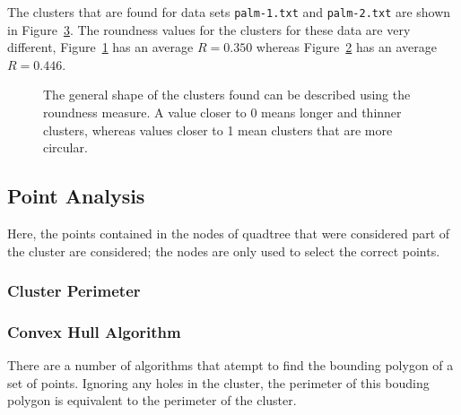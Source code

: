 The clusters that are found for data sets \texttt{palm-1.txt} and
\texttt{palm-2.txt} are shown in Figure~\ref{fig:roundness}. The roundness
values for the clusters for these data are very different,
Figure~\ref{fig:roundness-long.png} has an average $R=0.350$ whereas
Figure~\ref{fig:roundness-round.png} has an average $R=0.446$.

\begin{figure}[tbhp]
	\centering
	\begin{subfigure}[b]{4.2cm}
		\caption{}\label{fig:roundness-long.png}
	\end{subfigure}%
	\quad
	\begin{subfigure}[b]{4.2cm}
		\caption{}\label{fig:roundness-round.png}
	\end{subfigure}

	\caption[A comparison of roundness values.]{The general shape of the
		clusters found can be described using the roundness measure. A value
		closer to 0 means longer and thinner clusters, whereas values closer to
		1 mean clusters that are more circular.}\label{fig:roundness}
\end{figure}

\subsection{Point Analysis}
\label{sub:point_analysis}

Here, the points contained in the nodes of quadtree that were considered part
of the cluster are considered; the nodes are only used to select the correct
points.

\subsubsection{Cluster Perimeter}
\label{ssub:cluster_perimeter_point}

\subsubsection*{Convex Hull Algorithm}
\label{ssub:Convex Hull Algorithm}

There are a number of algorithms that atempt to find the bounding polygon of a
set of points. Ignoring any holes in the cluster, the perimeter of this bouding
polygon is equivalent to the perimeter of the cluster.


